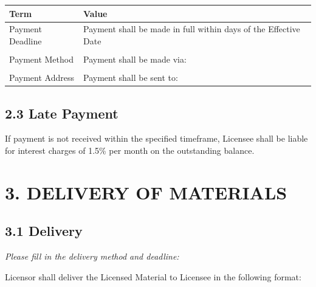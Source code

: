 \documentclass[
  11pt,
]{article}
\begin{document}
\begin{table}[h]
\centering
\begin{tabular}{L{3.5cm}L{10.5cm}}
\toprule
\textbf{Term} & \textbf{Value} \\
\midrule
Payment Deadline & Payment shall be made in full within \underline{\hspace{2cm}} days of the Effective Date \\
\vspace{0.3cm} & \\
Payment Method & Payment shall be made via: \underline{\hspace{6cm}} \\
\vspace{0.3cm} & \\
Payment Address & Payment shall be sent to: \underline{\hspace{6cm}} \\
\bottomrule
\end{tabular}
\end{table}

\hypertarget{late-payment}{%
\subsection{2.3 Late Payment}\label{late-payment}}

If payment is not received within the specified timeframe, Licensee
shall be liable for interest charges of 1.5\% per month on the
outstanding balance.

\hypertarget{delivery-of-materials}{%
\section{3. DELIVERY OF MATERIALS}\label{delivery-of-materials}}

\hypertarget{delivery}{%
\subsection{3.1 Delivery}\label{delivery}}

\emph{Please fill in the delivery method and deadline:}

Licensor shall deliver the Licensed Material to Licensee in the
following format:
\end{document}
